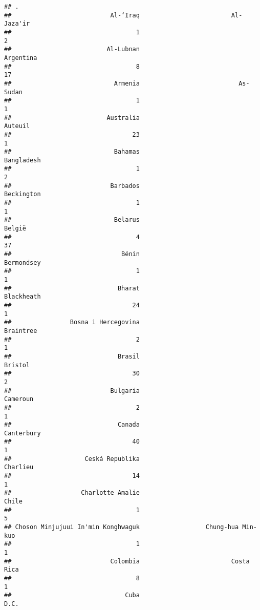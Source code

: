 \documentclass[]{article}
\begin{document}
\begin{verbatim}
## .
##                           Al-‘Iraq                         Al-Jaza'ir 
##                                  1                                  2 
##                          Al-Lubnan                          Argentina 
##                                  8                                 17 
##                            Armenia                           As-Sudan 
##                                  1                                  1 
##                          Australia                            Auteuil 
##                                 23                                  1 
##                            Bahamas                         Bangladesh 
##                                  1                                  2 
##                           Barbados                         Beckington 
##                                  1                                  1 
##                            Belarus                             België 
##                                  4                                 37 
##                              Bénin                         Bermondsey 
##                                  1                                  1 
##                             Bharat                         Blackheath 
##                                 24                                  1 
##                Bosna i Hercegovina                          Braintree 
##                                  2                                  1 
##                             Brasil                            Bristol 
##                                 30                                  2 
##                           Bulgaria                           Cameroun 
##                                  2                                  1 
##                             Canada                         Canterbury 
##                                 40                                  1 
##                    Ceská Republika                           Charlieu 
##                                 14                                  1 
##                   Charlotte Amalie                              Chile 
##                                  1                                  5 
## Choson Minjujuui In'min Konghwaguk                  Chung-hua Min-kuo 
##                                  1                                  1 
##                           Colombia                         Costa Rica 
##                                  8                                  1 
##                               Cuba                               D.C. 

\end{verbatim}
\end{document}
